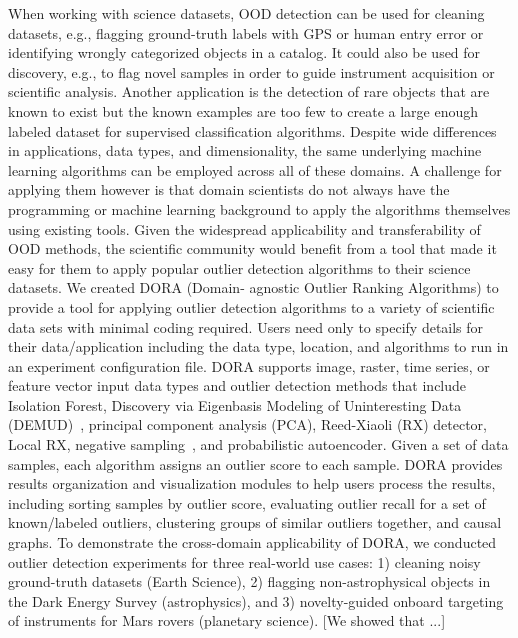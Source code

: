 \documentclass[letterpaper]{article} %
\begin{document}
   When working with science datasets, OOD detection can be used for 
   cleaning datasets, e.g., flagging ground-truth labels with GPS or human
    entry error or identifying wrongly categorized objects in a catalog. 
    It could also be used for discovery, e.g., to flag novel samples in order 
    to guide instrument acquisition or scientific analysis. Another application
   is the detection of rare objects that are known to exist but the known
   examples are too few to create a large enough labeled dataset for 
   supervised classification algorithms. 
  Despite wide differences in applications, data types, and dimensionality,
 the same underlying machine learning algorithms can be employed across 
 all of these domains. A challenge for applying them however is that domain
 scientists do not always have the programming or machine learning background
 to apply the algorithms themselves using existing tools. Given the widespread 
 applicability and transferability of OOD methods, the scientific community 
 would benefit from a tool that made it easy for them to apply popular outlier
 detection algorithms to their science datasets. We created DORA (Domain-
 agnostic Outlier Ranking Algorithms) to provide a tool for applying outlier 
 detection algorithms to a variety of scientific data sets with minimal coding
 required. Users need only to specify details for their data/application 
 including the data type, location, and algorithms to run in an experiment
 configuration file. DORA supports image, raster, time series, 
or feature vector input data types and outlier detection methods that include
 Isolation Forest, Discovery via Eigenbasis Modeling of Uninteresting Data 
 (DEMUD)~\citep{wagstaff:demud13}, principal component analysis (PCA),
   Reed-Xiaoli (RX) detector,  
 Local RX, negative sampling~\cite{sipple:neg-sampling20}, and probabilistic 
 autoencoder. Given a set of data samples, each algorithm assigns an outlier 
 score to each sample. DORA provides results organization and visualization 
 modules to help users process the results, including sorting samples by outlier 
 score, evaluating outlier recall for a set of known/labeled outliers, clustering 
 groups of similar outliers together, and causal graphs. To demonstrate the 
 cross-domain applicability of DORA, we conducted outlier detection experiments 
 for three real-world use cases: 1) cleaning noisy ground-truth datasets (Earth 
 Science), 2) flagging non-astrophysical objects in the Dark Energy Survey 
 (astrophysics), and 3) novelty-guided onboard targeting of instruments for Mars 
 rovers (planetary science). [We showed that ...]
\end{document}

